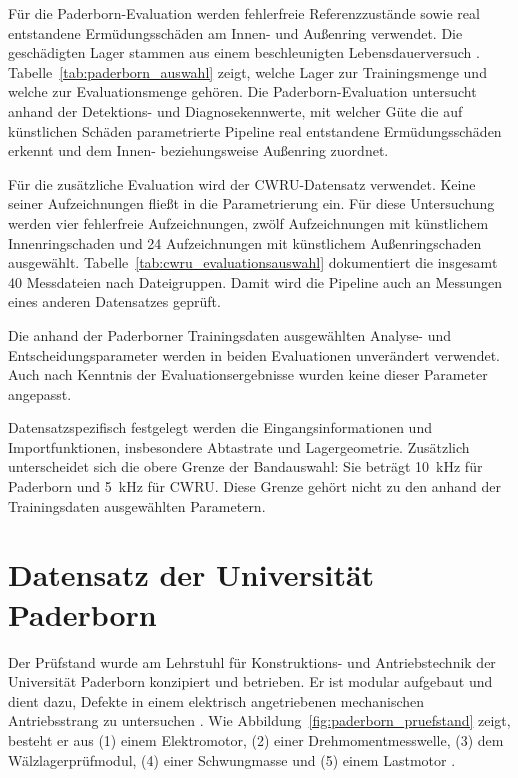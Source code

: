 Für die Paderborn-Evaluation werden fehlerfreie Referenzzustände sowie real
entstandene Ermüdungsschäden am Innen- und Außenring verwendet. Die geschädigten
Lager stammen aus einem beschleunigten Lebensdauerversuch
\cite[S.~6, Tab.~5; S.~8, Tab.~7]
{lessmeierConditionMonitoringBearing2016}.
Tabelle~\ref{tab:paderborn_auswahl} zeigt, welche Lager zur Trainingsmenge
und welche zur Evaluationsmenge gehören.
Die Paderborn-Evaluation untersucht anhand der Detektions- und Diagnosekennwerte, mit
welcher Güte die auf künstlichen Schäden parametrierte Pipeline real entstandene
Ermüdungsschäden erkennt und dem Innen- beziehungsweise Außenring zuordnet.

Für die zusätzliche Evaluation wird der CWRU-Datensatz verwendet. Keine seiner
Aufzeichnungen fließt in die Parametrierung ein.
Für diese Untersuchung werden vier fehlerfreie Aufzeichnungen, zwölf Aufzeichnungen
mit künstlichem Innenringschaden und 24 Aufzeichnungen mit künstlichem
Außenringschaden ausgewählt. Tabelle~\ref{tab:cwru_evaluationsauswahl} dokumentiert
die insgesamt 40 Messdateien nach Dateigruppen. Damit wird die Pipeline auch an
Messungen eines anderen Datensatzes geprüft.

Die anhand der Paderborner Trainingsdaten ausgewählten Analyse- und
Entscheidungsparameter werden in beiden Evaluationen unverändert verwendet.
Auch nach Kenntnis der Evaluationsergebnisse wurden keine dieser Parameter angepasst.

Datensatzspezifisch festgelegt werden die Eingangsinformationen und Importfunktionen,
insbesondere Abtastrate und Lagergeometrie. Zusätzlich unterscheidet sich die obere
Grenze der Bandauswahl: Sie beträgt 10~kHz für Paderborn und 5~kHz für CWRU.
Diese Grenze gehört nicht zu den anhand der Trainingsdaten ausgewählten Parametern.

\section{Datensatz der Universität Paderborn}
\label{sec:datensatz_paderborn}


Der Prüfstand wurde am Lehrstuhl für Konstruktions- und Antriebstechnik der
Universität Paderborn konzipiert und betrieben. Er ist modular aufgebaut und
dient dazu, Defekte in einem elektrisch angetriebenen mechanischen
Antriebsstrang zu untersuchen
\cite[S.~7, Abschn.~4]{lessmeierConditionMonitoringBearing2016}.
Wie Abbildung~\ref{fig:paderborn_pruefstand} zeigt, besteht er aus
(1) einem Elektromotor, (2) einer Drehmomentmesswelle,
(3) dem Wälzlagerprüfmodul, (4) einer Schwungmasse und (5) einem Lastmotor
\cite[S.~7, Abschn.~4.1 und Abb.~4]
{lessmeierConditionMonitoringBearing2016}.

